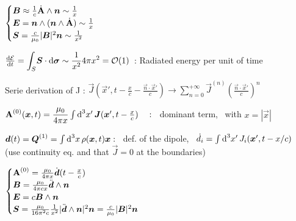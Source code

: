 \item $        \begin{cases}
\vec{B} \approx \frac{1}{c}\dot{\vec{\rm{A}}} \wedge \vec{n} \sim \frac{1}{x} \\
\vec{E} = \vec{n} \wedge (\vec{n} \wedge \dot{\vec{\rm{A}}}) \sim \frac{1}{x} \\
\vec{S} = \frac{c}{\mu_0} |\vec{B}|^2\vec{n} \sim \frac{1}{x^2}\\
\end{cases}$

\item $ \frac{\ud \E}{\ud t} = \displaystyle{\int_{S}} \vec{S}\cdot \vec{\ud \sigma} \sim \frac{1}{x^2}4\pi x^2 = \mathcal{O}(1)\, $ : Radiated energy per unit of time\\

\squishend 


\squishlist
\item Serie derivation of J : $ \vec{J}(\vec{x}', t - \frac{x}{c} - \frac{\vec{n}\cdot\vec{x}'}{c}) \rightarrow \sum_{n=0}^{+\infty} \vec{J}^{(n)} \left(\frac{\vec{n}\cdot\vec{x}'}{c}\right)^n$

\item $\vec{\rm{A}}^{(0)}(\vec{x},t) = \dfrac{\mu_0}{4\pi x} \int \ud ^3x' \, \vec{J}(\vec{x}', t-\frac{x}{c}) \quad :$ \,  dominant term, \, with $x = |\vec{x}|$

\item $\vec{d}(t) = \vec{Q}^{(1)} = \int \ud ^3x \, \rho(\vec{x},t)\vec{x}  :$ \, def. of the dipole, \, $\dot{d}_i = \int \ud ^3x' \, J_i(\vec{x}',t-x/c)$ \, (use continuity eq. and that $\vec{J}=0$ at the boundaries)

\item$        \begin{cases}
\vec{\rm{A}}^{(0)} = \frac{\mu_0}{4\pi x}\dot{\vec{d}}(t-\frac{x}{c}) \\
\vec{B} =\frac{\mu_0}{4\pi c x} \ddot{\vec{d}} \wedge \vec{n} \\
\vec{E} = c\vec{B} \wedge \vec{n}\\
\vec{S} = \frac{\mu_0}{16\pi^2c}\frac{1}{x^2} |\ddot{\vec{d}} \wedge \vec{n}|^2\vec{n} = \frac{c}{\mu_0} |\vec{B}|^2\vec{n}
\end{cases} $

